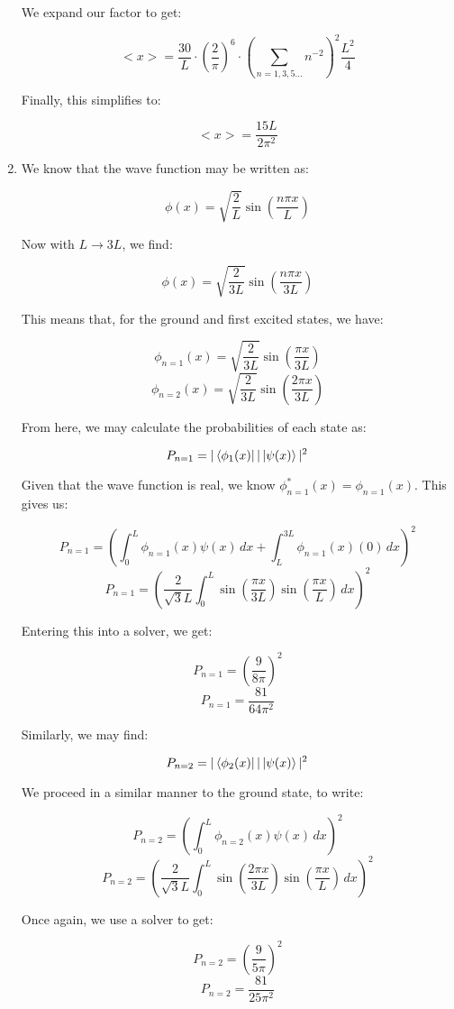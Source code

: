 \begin{enumerate}
    We expand our factor to get:

    $$<x>=\frac{30}{L}\cdot\left( \frac{2}{\pi} \right)^6\cdot\left( \sum_{n=1,3,5\ldots} n^{-2} \right)^2\frac{L^2}{4}$$

    Finally, this simplifies to:

    $$\boxed{<x>=\frac{15L}{2\pi^2}}$$

  \item We know that the wave function may be written as:

    $$\phi(x)=\sqrt{\frac{2}{L}}\sin\left( \frac{n\pi x}{L} \right)$$

    Now with $L\to3L$, we find:

    $$\phi(x)=\sqrt{\frac{2}{3L}}\sin\left( \frac{n\pi x}{3L} \right)$$

    This means that, for the ground and first excited states, we have:

    $$\phi_{n=1}(x)=\sqrt{\frac{2}{3L}}\sin\left( \frac{\pi x}{3L} \right)$$
    $$\phi_{n=2}(x)=\sqrt{\frac{2}{3L}}\sin\left( \frac{2\pi x}{3L} \right)$$

    From here, we may calculate the probabilities of each state as:

    $$P_{n=1}=|\bra{\phi_1(x)}|\ket{\psi(x)}|^2$$

    Given that the wave function is real, we know $\phi_{n=1}^*(x)=\phi_{n=1}(x)$. This gives us:

    $$P_{n=1}=\left( \int_0^L \phi_{n=1}(x)\psi(x)\,dx+\int_{L}^{3L} \phi_{n=1}(x)(0)\,dx \right)^2$$
    $$P_{n=1}=\left( \frac{2}{\sqrt{3}L}\int_0^L \sin\left( \frac{\pi x}{3L} \right)\sin\left( \frac{\pi x}{L} \right)\,dx\right)^2$$

    Entering this into a solver, we get:

    $$P_{n=1}=\left( \frac{9}{8\pi}\right)^2$$
    $$\boxed{P_{n=1}=\frac{81}{64\pi^2}}$$

    Similarly, we may find:

    $$P_{n=2}=|\bra{\phi_2(x)}|\ket{\psi(x)}|^2$$

    We proceed in a similar manner to the ground state, to write:

    $$P_{n=2}=\left( \int_0^L \phi_{n=2}(x)\psi(x)\,dx\right)^2$$
    $$P_{n=2}=\left( \frac{2}{\sqrt{3}L}\int_0^L \sin\left( \frac{2\pi x}{3L} \right)\sin\left( \frac{\pi x}{L} \right)\,dx\right)^2$$

    Once again, we use a solver to get:

    $$P_{n=2}=\left( \frac{9}{5\pi}\right)^2$$
    $$\boxed{P_{n=2}=\frac{81}{25\pi^2}}$$

\end{enumerate}



